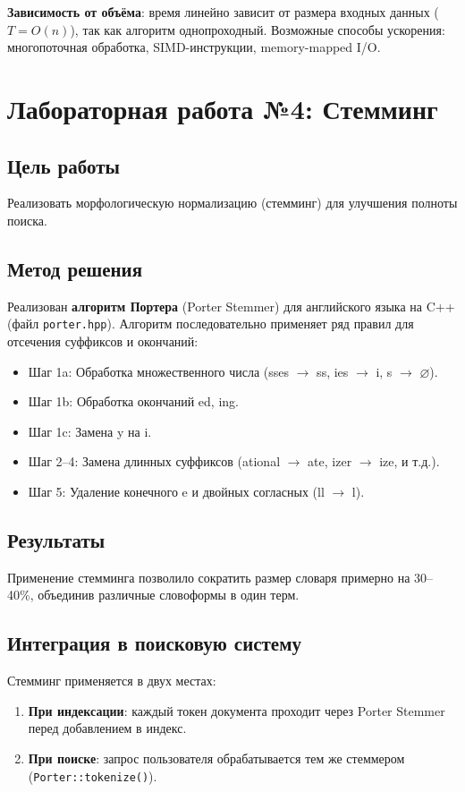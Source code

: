 \documentclass[a4paper,12pt]{article}
\begin{document}
\textbf{Зависимость от объёма}: время линейно зависит от размера входных данных ($T = O(n)$), так как алгоритм однопроходный. Возможные способы ускорения: многопоточная обработка, SIMD-инструкции, memory-mapped I/O.

\section{Лабораторная работа №4: Стемминг}

\subsection{Цель работы}
Реализовать морфологическую нормализацию (стемминг) для улучшения полноты поиска.

\subsection{Метод решения}
Реализован \textbf{алгоритм Портера} (Porter Stemmer) для английского языка на C++ (файл \texttt{porter.hpp}). Алгоритм последовательно применяет ряд правил для отсечения суффиксов и окончаний:
\begin{itemize}
    \item Шаг 1a: Обработка множественного числа (sses $\to$ ss, ies $\to$ i, s $\to$ $\varnothing$).
    \item Шаг 1b: Обработка окончаний ed, ing.
    \item Шаг 1c: Замена y на i.
    \item Шаг 2--4: Замена длинных суффиксов (ational $\to$ ate, izer $\to$ ize, и т.д.).
    \item Шаг 5: Удаление конечного e и двойных согласных (ll $\to$ l).
\end{itemize}

\subsection{Результаты}
Применение стемминга позволило сократить размер словаря примерно на 30--40\%, объединив различные словоформы в один терм.

\subsection{Интеграция в поисковую систему}
Стемминг применяется в двух местах:
\begin{enumerate}
    \item \textbf{При индексации}: каждый токен документа проходит через Porter Stemmer перед добавлением в индекс.
    \item \textbf{При поиске}: запрос пользователя обрабатывается тем же стеммером (\texttt{Porter::tokenize()}).
\end{enumerate}
\end{document}
